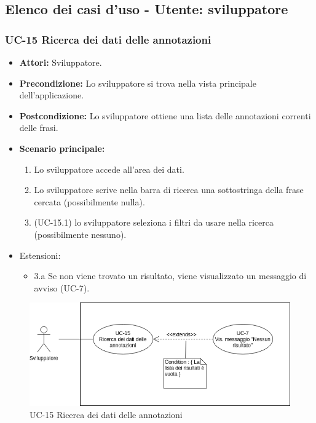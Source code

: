 \subsection{Elenco dei casi d'uso - Utente: sviluppatore}	\subsubsection{UC-15 Ricerca dei dati delle annotazioni}	
		\begin{itemize}
			\item \textbf{Attori:} Sviluppatore.
			\item \textbf{Precondizione:} Lo sviluppatore si trova nella vista principale dell'applicazione.
			\item \textbf{Postcondizione:} Lo sviluppatore ottiene una lista delle annotazioni correnti delle frasi.
			\item \textbf{Scenario principale:}
				\begin{enumerate}
					\item Lo sviluppatore accede all'area dei dati.
					\item Lo sviluppatore scrive nella barra di ricerca una sottostringa della frase cercata (possibilmente nulla).
					\item (UC-15.1) lo sviluppatore seleziona i filtri da usare nella ricerca (possibilmente nessuno).
				\end{enumerate}
			\item Estensioni:
				\begin{itemize}
					\item 3.a Se non viene trovato un risultato, viene visualizzato un messaggio di avviso (UC-7).
				\end{itemize}
		\end{itemize}

\begin{figure}[h]
			\centering
			\includegraphics[scale=0.7]{images/UC-15.png}
			\caption{UC-15 Ricerca dei dati delle annotazioni}
		\end{figure}

